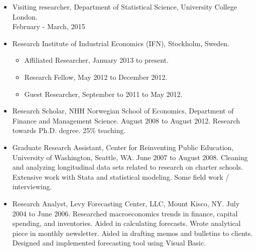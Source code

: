 \documentclass[margin]{res}
\begin{document}
\begin{resume}
\begin{itemize}
                  \item[] Visiting researcher, Department of Statistical Science, University College London. \\ February - March, 2015
                  
                  \item[] Research Institute of Industrial Economics (IFN), Stockholm, Sweden.
                    \begin{itemize} 
                    \item[] Affiliated Researcher, January 2013 to present.
                    \item[] Research Fellow, May 2012 to December 2012.
                    \item[] Guest Researcher, September to 2011 to May 2012.
                    \end{itemize}
                  \item[] Research Scholar, NHH Norwegian School of Economics, Department of Finance and Management Science. August 2008 to August 2012.  
                  Research towards Ph.D. degree.  25\% teaching.
                  
                  \item[] Graduate Research Assistant, Center for Reinventing Public Education, University of Washington, Seattle, WA. June 2007 to August 2008.  
                  Cleaning and analyzing longitudinal data sets related to research on charter schools.  Extensive work with Stata and statistical modeling.  Some field work / interviewing.
                  
                  \item[] Research Analyst, Levy Forecasting Center, LLC, Mount Kisco, NY. July 2004 to June 2006.  
                  Researched macroeconomics trends in finance, capital spending, and inventories. Aided in calculating forecasts. Wrote analytical piece in monthly newsletter. Aided in drafting memos and bulletins to clients. Designed and implemented forecasting tool using Visual Basic. 

                  \end{itemize}
                   

\end{resume}
\end{document}
